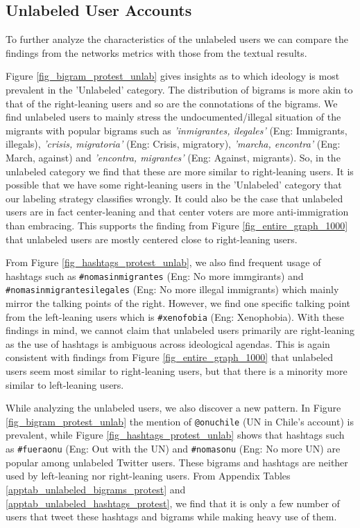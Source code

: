  \subsection{Unlabeled User Accounts}\label{unlab_users_affiliation}    
        
        To further analyze the characteristics of the unlabeled users we can compare the findings from the networks metrics with those from the textual results. 

            \newline\indent
        Figure \ref{fig_bigram_protest_unlab} gives insights as to which ideology is most prevalent in the 'Unlabeled' category. The distribution of bigrams is more akin to that of the right-leaning users and so are the connotations of the bigrams. We find unlabeled users to mainly stress the undocumented/illegal situation of the migrants with popular bigrams such as {\it 'inmigrantes, ilegales'} (Eng: Immigrants, illegals), {\it 'crisis, migratoria'} (Eng: Crisis, migratory), {\it 'marcha, encontra'} (Eng: March, against) and {\it 'encontra, migrantes'} (Eng: Against, migrants). So, in the unlabeled category we find that these are more similar to right-leaning users. It is possible that we have some right-leaning users in the 'Unlabeled' category that our labeling strategy classifies wrongly. It could also be the case that unlabeled users are in fact center-leaning and that center voters are more anti-immigration than embracing. This supports the finding from Figure \ref{fig_entire_graph_1000} that unlabeled users are mostly centered close to right-leaning users.
    
            \newline\indent
        From Figure \ref{fig_hashtags_protest_unlab}, we also find frequent usage of hashtags such as \texttt{\#nomasinmigrantes} (Eng: No more immgirants) and \texttt{\#nomasinmigrantesilegales} (Eng: No more illegal immigrants) which mainly mirror the talking points of the right. However, we find one specific talking point from the left-leaning users which is \texttt{\#xenofobia} (Eng: Xenophobia). With these findings in mind, we cannot claim that unlabeled users primarily are right-leaning as the use of hashtags is ambiguous across ideological agendas. This is again consistent with findings from Figure \ref{fig_entire_graph_1000} that unlabeled users seem most similar to right-leaning users, but that there is a minority more similar to left-leaning users.
        
            \newline\indent
        While analyzing the unlabeled users, we also discover a new pattern. In Figure \ref{fig_bigram_protest_unlab} the mention of \texttt{@onuchile} (UN in Chile's account) is prevalent, while Figure \ref{fig_hashtags_protest_unlab} shows that hashtags such as \texttt{\#fueraonu} (Eng: Out with the UN) and \texttt{\#nomasonu} (Eng: No more UN) are popular among unlabeled Twitter users. These bigrams and hashtags are neither used by left-leaning nor right-leaning users. From Appendix Tables \ref{apptab_unlabeled_bigrams_protest} and \ref{apptab_unlabeled_hashtags_protest}, we find that it is only a few number of users that tweet these hashtags and bigrams while making heavy use of them. 
        
